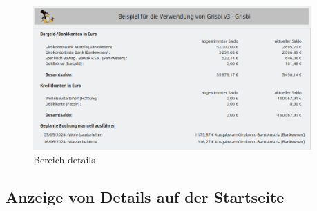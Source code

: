 \begin{figure}[htbp]			%
	\begin{center}
		\includegraphics[width=0.95\textwidth]{image/screenshot/home_details.png}
	\end{center}
	\caption{Bereich details}		%
	\label{home_details}
\end{figure}
 
\subsection{Anzeige von Details auf der Startseite\label{home-details-homepage}}

